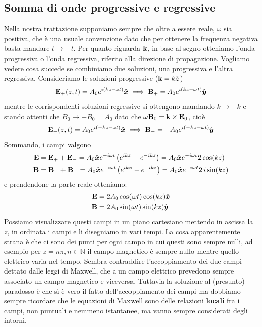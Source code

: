 \subsection{Somma di onde progressive e regressive}
Nella nostra trattazione supponiamo sempre che oltre a essere reale, $ \omega $ sia positiva, che è una usuale convenzione dato che per ottenere la 
frequenza negativa basta mandare $ t \to -t $. Per quanto riguarda $ \mathbf{ k } $, in base al segno otteniamo l'onda progressiva o l'onda regressiva, 
riferito alla direzione di propagazione. Vogliamo vedere cosa succede se combiniamo due soluzioni, una progressiva e l'altra regressiva.
Consideriamo le soluzioni progressive ($ \mathbf{ k }=k \hat{\boldsymbol{z}} $)
\begin{equation}
  \mathbf{ E }_+(z,t) = A_0  e^{i\left( kz-\omega t \right)}\hat{\boldsymbol{x}} \implies \mathbf{ B }_+ = A_0  e^{i\left( kz-\omega t \right)}\hat{\boldsymbol{y}}
\end{equation}
mentre le corrispondenti soluzioni regressive si ottengono mandando $ k \to -k $ e stando attenti che $ B_0\to -B_0 = A_0 $ dato che 
$ \omega \mathbf{ B }_0 = \mathbf{ k\times E }_0 $, cioè
\begin{equation}
  \mathbf{ E }_-(z,t) = A_0  e^{i\left( -kz-\omega t \right)}\hat{\boldsymbol{x}} \implies \mathbf{ B }_- = -A_0  e^{i\left( -kz-\omega t \right)}\hat{\boldsymbol{y}}
\end{equation}
Sommando, i campi valgono
\begin{align}
  \mathbf{ E } &= \mathbf{ E }_+ + \mathbf{ E }_- = A_0 \hat{\boldsymbol{x}} e^{-i\omega t}\left( e^{ikz} + e^{-ikz} \right)= A_0\hat{\boldsymbol{x}}e^{-i\omega t}2 \cos (kz)
  \\
  \mathbf{ B } &= \mathbf{ B }_+ + \mathbf{ B }_- = A_0 \hat{\boldsymbol{x}} e^{-i\omega t}\left( e^{ikz} - e^{-ikz} \right)= A_0\hat{\boldsymbol{x}}e^{-i\omega t}2\, i \sin(kz)
\end{align}
e prendendone la parte reale otteniamo:
\begin{align}
  \mathbf{ E } &= 2A_0 \cos(\omega t) \cos (kz) \hat{\boldsymbol{x}}
  \\
  \mathbf{ B } &= 2A_0 \sin(\omega t) \sin (kz) \hat{\boldsymbol{y}}
\end{align}
Possiamo visualizzare questi campi in un piano cartesiano mettendo in ascissa la $ z $, in ordinata i campi e li disegniamo in vari tempi. La cosa 
apparentemente strana è che ci sono dei punti per ogni campo in cui questi sono sempre nulli, ad esempio per $ z = n\pi, n\in \mathbb{N} $ il campo 
magnetico è sempre nullo mentre quello elettrico varia nel tempo. Sembra contraddire l'accoppiamento dei due campi dettato dalle leggi di Maxwell, 
che a un campo elettrico prevedono sempre associato un campo magnetico e viceversa. Tuttavia la soluzione al (presunto) paradosso è che sì è vero 
il fatto dell'accoppiamento dei campi ma dobbiamo sempre ricordare che le equazioni di Maxwell sono delle relazioni \textbf{locali} fra i campi, 
non puntuali e nemmeno istantanee, ma vanno sempre considerati degli intorni.

